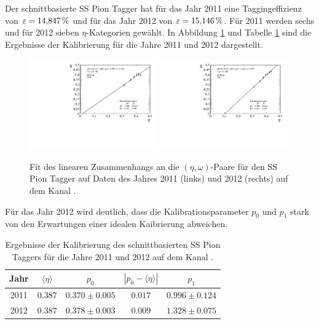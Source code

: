 Der schnittbasierte SS Pion Tagger hat für das Jahr \num{2011} eine Taggingeffizienz von $\varepsilon=\SI{14{,}847}{\%}$ und für das Jahr \num{2012} von $\varepsilon=\SI{15{,}146}{\%}$. Für \num{2011} werden sechs und für \num{2012} sieben $\eta$-Kategorien gewählt. In Abbildung \ref{fig:fit_SSPion} und Tabelle \ref{tab:result_SSPion} sind die Ergebnisse der Kalibrierung für die Jahre \num{2011} und \num{2012} dargestellt.
\begin{figure}[htbp]
	\centering
		\includegraphics[width=0.49\textwidth]{fig/2011_SSPion.pdf}
		\includegraphics[width=0.49\textwidth]{fig/2012_SSPion.pdf}
	\caption{Fit des linearen Zusammenhangs an die $(\eta,\omega)$-Paare für den SS Pion Tagger auf Daten des Jahres \num{2011} (links) und \num{2012} (rechts) auf dem Kanal \BdToDpi.}
	\label{fig:fit_SSPion} 
\end{figure}
Für das Jahr \num{2012} wird deutlich, dass die Kalibrationsparameter $p_0$ und $p_1$ stark von den Erwartungen einer idealen Kaibrierung abweichen.
\begin{table}[htbp]
	\centering
	\caption{Ergebnisse der Kalibrierung des schnittbasierten SS Pion Taggers für die Jahre \num{2011} und \num{2012} auf dem Kanal \BdToDpi.}
	\label{tab:result_SSPion}
	\begin{tabular}{ccccc}
	\toprule
       Jahr & $\langle\eta\rangle$ & $p_0$ & $\left|p_0-\langle\eta\rangle\right|$ & $p_1$ \\
       \midrule
	2011 & $0{.}387$ & $0{.}370\pm0{.}005$ & $0{.}017$ & $0{.}996\pm0{.}124$ \\
   2012 & $0{.}387$ & $0{.}378\pm0{.}003$ & $0{.}009$ & $1{.}328\pm0{.}075$ \\ 
   \bottomrule
	\end{tabular}
\end{table}
